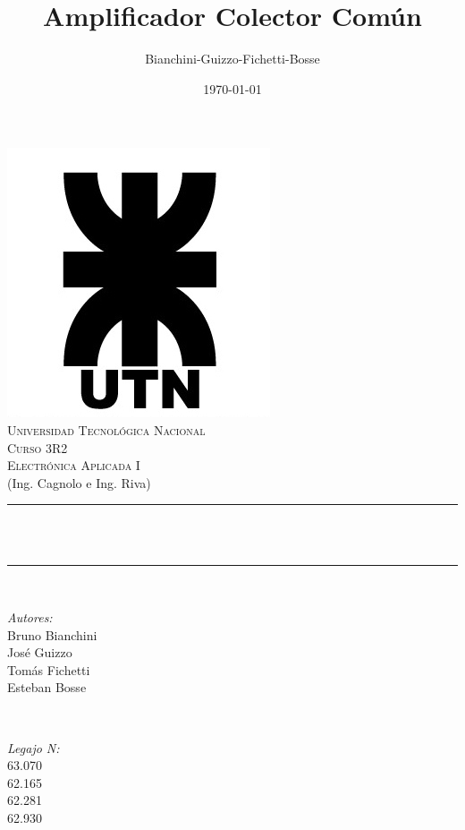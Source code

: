 \documentclass[12pt]{article}
\title{Amplificador Colector Común}								%
\author{Bianchini-Guizzo-Fichetti-Bosse}								%
\date{\today}											%
\makeatletter
\let\thetitle\@title
\let\thedate\@date
\makeatother
\begin{document}

\begin{titlepage}
	\centering
    \vspace*{0.5 cm}
    \includegraphics[scale = 0.45]{utn_logo.jpg}\\[1.0 cm]	%
    \textsc{\LARGE Universidad Tecnológica Nacional}\\[2.0 cm]	%
	\textsc{\Large Curso 3R2}\\[0.5 cm]				%
	\textsc{\large Electrónica Aplicada I}\\[0 cm]				%
	\textrm{\large (Ing. Cagnolo e Ing. Riva)}\\[0.5 cm]
    \rule{\linewidth}{0.2 mm} \\[0.4 cm]
	{ \huge \bfseries \thetitle}\\
	\rule{\linewidth}{0.2 mm} \\[1 cm]
	
	\begin{minipage}{0.4\textwidth}
		\begin{flushleft} \large
			\emph{Autores:}\\
			Bruno Bianchini\\José Guizzo\\Tomás Fichetti\\Esteban Bosse
			\end{flushleft}
			\end{minipage}~
			\begin{minipage}{0.4\textwidth}
			\begin{flushright} \large
			\emph{Legajo N:} \\
			 63.070\\62.165\\62.281\\62.930									%
		\end{flushright}
	\end{minipage}\\[2 cm]
	
	{\large \thedate}\\[2 cm]
 
	\vfill
	
\end{titlepage}
\end{document}
